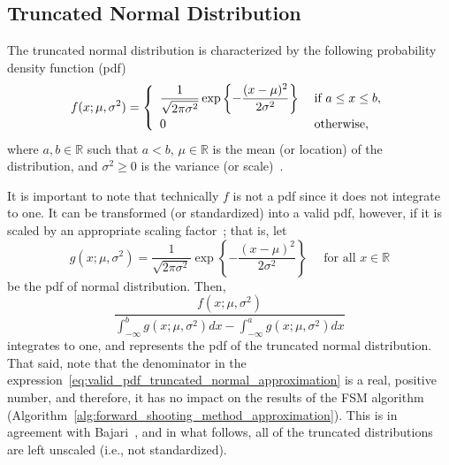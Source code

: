 \subsection{Truncated Normal Distribution} %
\label{sub:truncated_normal_distribution_approximation}
The truncated normal distribution is characterized by the following probability density function (pdf)
\begin{equation}
  \label{eq:pdf_truncated_normal_approximation}
  f(x; \mu, \sigma^2) = \left\{
  \begin{array}{l l}
    \displaystyle\frac{1}{\sqrt{2\pi\sigma^2}}\exp\left\{-\frac{(x-\mu)^2}{2\sigma^2}\right\} & \;\text{if } a\leq x\leq b,\\[2ex]
    0 & \;\text{otherwise},
  \end{array}\right.
\end{equation}
where $a,b\in\mathbb{R}$ such that $a < b$, $\mu\in\mathbb{R}$ is the mean (or location) of the distribution, and $\sigma^2\geq 0$ is the variance (or scale)~\cite{JohnsonNormal1994,Cohen1991}.

It is important to note that technically $f$ is not a pdf since it does not integrate to one. It can be transformed (or standardized) into a valid pdf, however, if it is scaled by an appropriate scaling factor~\cite{Cohen1991}; that is, let
\begin{equation*}
  g(x; \mu, \sigma^2) = \displaystyle\frac{1}{\sqrt{2\pi\sigma^2}}\exp\left\{-\frac{(x-\mu)^2}{2\sigma^2}\right\} \quad\text{ for all } x\in\mathbb{R}
\end{equation*}
be the pdf of normal distribution. Then,
\begin{equation}
  \label{eq:valid_pdf_truncated_normal_approximation}
  \displaystyle\frac{f(x;\mu, \sigma^2)}{\int_{-\infty}^b g(x;\mu,\sigma^2)dx - \int_{-\infty}^a g(x;\mu,\sigma^2)dx}
\end{equation}
integrates to one, and represents the pdf of the truncated normal distribution. That said, note that the denominator in the expression~\eqref{eq:valid_pdf_truncated_normal_approximation} is a real, positive number, and therefore, it has no impact on the results of the FSM algorithm (Algorithm~\ref{alg:forward_shooting_method_approximation}). This is in agreement with Bajari~\cite{Bajari2001a}, and in what follows, all of the truncated distributions are left unscaled (i.e., not standardized).

